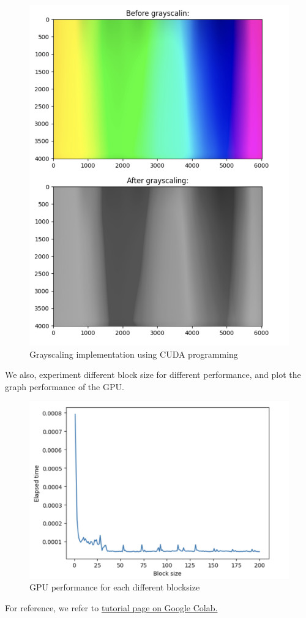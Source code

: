 \documentclass{article}
\begin{document}
\begin{figure}
    \centering
    \includegraphics[width=1\linewidth]{result.png}
    \caption{Grayscaling implementation using CUDA programming}
    \label{fig:placeholder}
\end{figure}

We also, experiment different block size for different performance, and plot the graph performance of the GPU.

\begin{figure}
    \centering
    \includegraphics[width=1\linewidth]{performance.png}
    \caption{GPU performance for each different blocksize}
    \label{fig:placeholder}
\end{figure}

For reference, we refer to \href{https://colab.research.google.com/github/HamzaGbada/Numba-cuda/blob/main/Numba_CUDA.ipynb}{tutorial page on Google Colab.}
\end{document}
